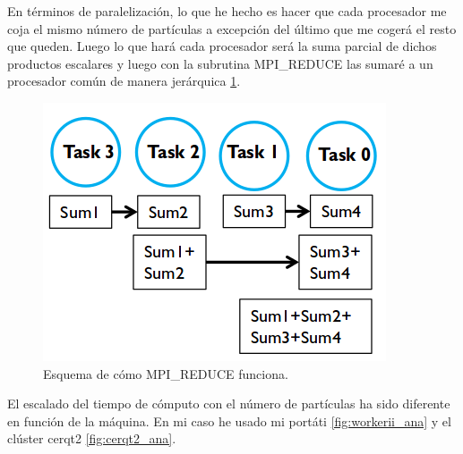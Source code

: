 \documentclass[onecolumn]{article}
\begin{document}
En términos de paralelización, lo que he hecho es hacer que cada procesador me coja el mismo número de partículas a excepción del último que me cogerá el resto que queden. Luego lo que hará cada procesador será la suma parcial de dichos productos escalares y luego con la subrutina \textsf{MPI\_REDUCE} las sumaré a un procesador común de manera jerárquica \ref{fig:reduce}.
\begin{figure}[H]
\includegraphics[scale=0.50]{reduce.png} 
\caption{Esquema de cómo \textsf{MPI\_REDUCE} funciona.} 
\label{fig:reduce}
\end{figure}
El escalado del tiempo de cómputo con el número de partículas ha sido diferente en función de la máquina. En mi caso he usado mi portáti \ref{fig:workerii_ana} y el clúster cerqt2 \ref{fig:cerqt2_ana}.
\end{document}

